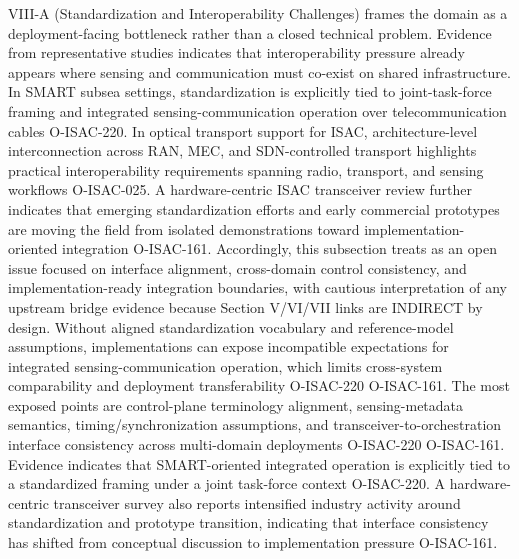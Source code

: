 {}VIII-A (Standardization and Interoperability Challenges) frames the  domain as a deployment-facing bottleneck rather than a closed technical problem. Evidence from representative studies indicates that interoperability pressure already appears where sensing and communication must co-exist on shared infrastructure. In SMART subsea settings, standardization is explicitly tied to joint-task-force framing and integrated sensing-communication operation over telecommunication cables O-ISAC-220. In optical transport support for ISAC, architecture-level interconnection across RAN, MEC, and SDN-controlled transport highlights practical interoperability requirements spanning radio, transport, and sensing workflows O-ISAC-025. A hardware-centric ISAC transceiver review further indicates that emerging standardization efforts and early commercial prototypes are moving the field from isolated demonstrations toward implementation-oriented integration O-ISAC-161. Accordingly, this subsection treats  as an open issue focused on interface alignment, cross-domain control consistency, and implementation-ready integration boundaries, with cautious interpretation of any upstream bridge evidence because Section V/VI/VII links are INDIRECT by design.\markdownRendererInterblockSeparator
{}
\markdownRendererSectionEnd \markdownRendererSectionBegin
{}\markdownRendererInterblockSeparator
{} Without aligned standardization vocabulary and reference-model assumptions, implementations can expose incompatible expectations for integrated sensing-communication operation, which limits cross-system comparability and deployment transferability O-ISAC-220 O-ISAC-161.\markdownRendererParagraphSeparator
{} The most exposed points are control-plane terminology alignment, sensing-metadata semantics, timing/synchronization assumptions, and transceiver-to-orchestration interface consistency across multi-domain deployments O-ISAC-220 O-ISAC-161.\markdownRendererParagraphSeparator
{} Evidence indicates that SMART-oriented integrated operation is explicitly tied to a standardized framing under a joint task-force context O-ISAC-220. A hardware-centric transceiver survey also reports intensified industry activity around standardization and prototype transition, indicating that interface consistency has shifted from conceptual discussion to implementation pressure O-ISAC-161.\markdownRendererParagraphSeparator
